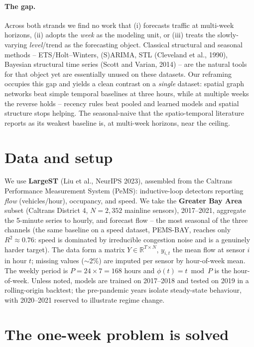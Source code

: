 \documentclass[11pt]{article}
\begin{document}
\paragraph{The gap.} Across both strands we find no work that (i) forecasts traffic
at multi-week horizons, (ii) adopts the \emph{week} as the modeling unit, or (iii)
treats the slowly-varying \emph{level}/trend as the forecasting object. Classical
structural and seasonal methods -- ETS/Holt--Winters, (S)ARIMA, STL (Cleveland et
al., 1990), Bayesian structural time series (Scott and Varian, 2014) -- are the
natural tools for that object yet are essentially unused on these datasets. Our
reframing occupies this gap and yields a clean contrast on a \emph{single} dataset:
spatial graph networks beat simple temporal baselines at three hours, while at
multiple weeks the reverse holds -- recency rules beat pooled and learned models and
spatial structure stops helping. The seasonal-naive that the spatio-temporal
literature reports as its weakest baseline is, at multi-week horizons, near the
ceiling.

\section{Data and setup}
\label{sec:data}
We use \textbf{LargeST} (Liu et al., NeurIPS 2023), assembled from the Caltrans
Performance Measurement System (PeMS): inductive-loop detectors reporting
\emph{flow} (vehicles/hour), occupancy, and speed. We take the \textbf{Greater Bay
Area} subset (Caltrans District 4, $N=2{,}352$ mainline sensors), 2017--2021,
aggregate the 5-minute series to hourly, and forecast flow -- the most seasonal of
the three channels (the same baseline on a speed dataset, PEMS-BAY, reaches only
$R^2\approx0.76$: speed is dominated by irreducible congestion noise and is a
genuinely harder target). The data form a matrix $Y\in\mathbb{R}^{T\times N}$,
$y_{i,t}$ the mean flow at sensor $i$ in hour $t$; missing values ($\sim$2\%) are
imputed per sensor by hour-of-week mean. The weekly period is $P=24\times7=168$
hours and $\phi(t)=t\bmod P$ is the hour-of-week. Unless noted, models are trained
on 2017--2018 and tested on 2019 in a rolling-origin backtest; the pre-pandemic
years isolate steady-state behaviour, with 2020--2021 reserved to illustrate
regime change.

\section{The one-week problem is solved}
\label{sec:oneweek}
\end{document}

